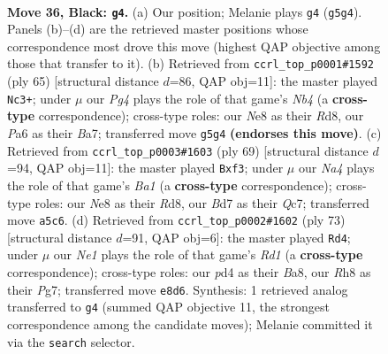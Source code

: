 \documentclass[11pt]{article}
\begin{document}
\clearpage

\begin{figure}[p]\centering
\begin{subfigure}{0.46\textwidth}\centering
\resizebox{\linewidth}{!}{%
\newchessgame
\chessboard[
  setfen={3qn2r/3b2k1/p4p2/n5pp/PQ1PP3/N7/B4PPP/R3K1N1 b - - 0 36},
  showmover=false,
  pgfstyle=straightmove, color=movearrow, markmove={g5-g4}
]}
\caption{}
\end{subfigure}\hfill
\begin{subfigure}{0.46\textwidth}\centering
\resizebox{\linewidth}{!}{%
\newchessgame
\chessboard[
  setfen={k2r4/bp1q4/p6p/1nP2p2/1PN2Q2/P7/7P/1K2RB2 b - - 0 33},
  showmover=false,
  pgfstyle=straightmove, color=movearrow, markmove={b5-c3}
]}
\caption{}
\end{subfigure}
\\[4pt]
\begin{subfigure}{0.46\textwidth}\centering
\resizebox{\linewidth}{!}{%
\newchessgame
\chessboard[
  setfen={b2r2k1/2q2p2/1n2p1p1/RBp4p/8/1P3PP1/PNP4P/2K1Q3 b - - 0 35},
  showmover=false,
  pgfstyle=straightmove, color=movearrow, markmove={a8-f3}
]}
\caption{}
\end{subfigure}\hfill
\begin{subfigure}{0.46\textwidth}\centering
\resizebox{\linewidth}{!}{%
\newchessgame
\chessboard[
  setfen={b2r2k1/p3q1p1/1n2p2p/1P2p3/4P3/P1Q3PB/1N5P/4R1K1 b - - 0 37},
  showmover=false,
  pgfstyle=straightmove, color=movearrow, markmove={d8-d4}
]}
\caption{}
\end{subfigure}
\caption{\textbf{Move 36, Black: \texttt{g4}.} (a) Our position; Melanie plays \texttt{g4} (\texttt{g5g4}). Panels (b)--(d) are the retrieved master positions whose correspondence most drove this move (highest QAP objective among those that transfer to it). (b) Retrieved from \texttt{ccrl\_top\_p0001\#1592} (ply 65) [structural distance $d$=86, QAP obj=11]: the master played \texttt{Nc3+}; under $\mu$ our \emph{Pg4} plays the role of that game's \emph{Nb4} (a \textbf{cross-type} correspondence); cross-type roles: our \emph{N}e8 as their \emph{R}d8, our \emph{P}a6 as their \emph{B}a7; transferred move \texttt{g5g4} \textbf{(endorses this move)}. (c) Retrieved from \texttt{ccrl\_top\_p0003\#1603} (ply 69) [structural distance $d$=94, QAP obj=11]: the master played \texttt{Bxf3}; under $\mu$ our \emph{Na4} plays the role of that game's \emph{Ba1} (a \textbf{cross-type} correspondence); cross-type roles: our \emph{N}e8 as their \emph{R}d8, our \emph{B}d7 as their \emph{Q}c7; transferred move \texttt{a5c6}. (d) Retrieved from \texttt{ccrl\_top\_p0002\#1602} (ply 73) [structural distance $d$=91, QAP obj=6]: the master played \texttt{Rd4}; under $\mu$ our \emph{Ne1} plays the role of that game's \emph{Rd1} (a \textbf{cross-type} correspondence); cross-type roles: our \emph{p}d4 as their \emph{B}a8, our \emph{R}h8 as their \emph{P}g7; transferred move \texttt{e8d6}. Synthesis: 1 retrieved analog transferred to \texttt{g4} (summed QAP objective 11, the strongest correspondence among the candidate moves); Melanie committed it via the \texttt{search} selector.}
\label{fig:thought-m71}
\end{figure}
\end{document}
